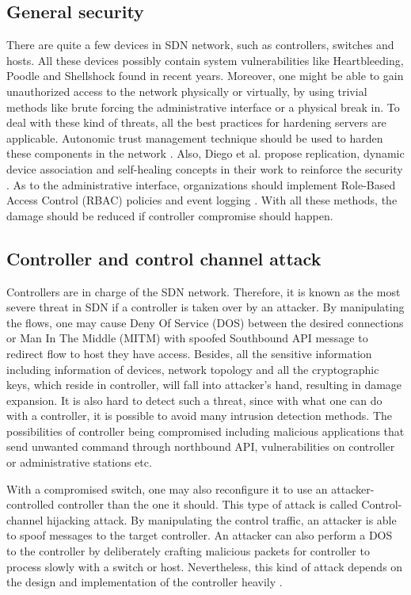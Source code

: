 \subsection{General security}
There are quite a few devices in SDN network, such as controllers, switches and hosts. All these devices possibly contain system vulnerabilities like Heartbleeding, Poodle and Shellshock \cite{HB,POODLE,SHELLSHOCK} found in recent years. Moreover, one might be able to gain unauthorized access to the network physically or virtually, by using trivial methods like brute forcing the administrative interface or a physical break in. To deal with these kind of threats, all the best practices for hardening servers are applicable. Autonomic trust management technique should be used to harden these components in the network \cite{YZP11}. Also, Diego et al. propose replication, dynamic device association and self-healing concepts in their work to reinforce the security \cite{KDFRV13}. As to the administrative interface, organizations should implement Role-Based Access Control (RBAC) policies and event logging \cite{FFR09}. With all these methods, the damage should be reduced if controller compromise should happen.

\subsection{Controller and control channel attack}
Controllers are in charge of the SDN network. Therefore, it is known as the most severe threat in SDN if a controller is taken over by an attacker. By manipulating the flows, one may cause Deny Of Service (DOS) between the desired connections or Man In The Middle (MITM) with spoofed Southbound API message to redirect flow to host they have access. Besides, all the sensitive information including information of devices, network topology and all the cryptographic keys, which reside in controller, will fall into attacker's hand, resulting in damage expansion. It is also hard to detect such a threat, since with what one can do with a controller, it is possible to avoid many intrusion detection methods. The possibilities of controller being compromised including malicious applications that send unwanted command through northbound API, vulnerabilities on controller or administrative stations etc.

With a compromised switch, one may also reconfigure it to use an attacker-controlled controller than the one it should. This type of attack is called Control-channel hijacking attack. By manipulating the control traffic, an attacker is able to spoof messages to the target controller. An attacker can also perform a DOS to the controller by deliberately crafting malicious packets for controller to process slowly with a switch or host. Nevertheless, this kind of attack depends on the design and implementation of the controller heavily \cite{AAS14}.

